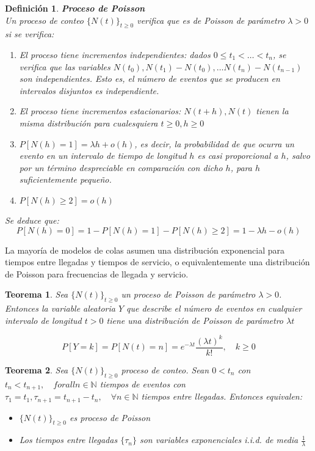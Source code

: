 \documentclass[a4paper,10pt]{scrartcl}
\newtheorem{mydefn}{Definición}
\newtheorem{theorem}{Teorema}
\numberwithin{equation}{section}
\begin{document}
  \begin{mydefn} \textbf{Proceso de Poisson}\\
  Un proceso de conteo $\{N(t)\}_{t\ge 0}$ verifica que es de Poisson de parámetro $\lambda > 0$ si se verifica:
  
  \begin{enumerate}
    \item El proceso tiene incrementos independientes: dados $0 \le t_1 < \ldots < t_n$, se verifica que
    las variables $N(t_0), N(t_1) - N(t_0), \ldots N(t_n)- N(t_{n-1})$ son independientes. Esto es, el número de eventos
    que se producen en intervalos disjuntos es independiente.
    \item El proceso tiene incrementos estacionarios: $N(t+h), N(t)$ tienen la misma distribución para cualesquiera
    $t\ge 0, h\ge 0$
    \item $P[N(h) = 1] = \lambda h + o(h)$, es decir, la probabilidad de que ocurra un evento en un intervalo de
    tiempo de longitud $h$ es casi proporcional a $h$, salvo por un término despreciable en comparación con dicho $h$, para
    $h$ suficientemente pequeño.
    \item $P[N(h) \ge 2] = o(h)$
  \end{enumerate}

  Se deduce que: 
  \[P[N(h) = 0] = 1 - P[N(h)=1] - P[N(h) \ge 2] = 1 -\lambda h - o(h)\]
  \end{mydefn}


La mayoría de modelos de colas asumen una distribución exponencial para tiempos entre llegadas y tiempos 
de servicio, o equivalentemente una distribución de Poisson para frecuencias de llegada y servicio.

\begin{theorem}
 Sea $\{N(t)\}_{t\ge 0}$ un proceso de Poisson de parámetro $\lambda > 0$. Entonces la variable aleatoria $Y$ que
 describe el número de eventos en cualquier intervalo de longitud $t > 0$ tiene una distribución de Poisson de parámetro
 $\lambda t$
 
 \[P[Y = k] = P[N(t) = n] = e^{-\lambda t} \frac{(\lambda t)^k}{k!}, \quad k\ge 0\]
 
\end{theorem}


\begin{theorem}
 Sea $\{N(t)\}_{t\ge 0}$ proceso de conteo. Sean $0 < t_n$ con $t_{n} < t_{n+1}, \quad forall n\in 
 \mathbb{N}$ tiempos de eventos con $\tau_1= t_1, \tau_{n+1} = t_{n+1} - t_{n}, \quad \forall n\in
 \mathbb{N}$ tiempos entre llegadas. Entonces equivalen:
 
 \begin{itemize}
  \item $\{N(t)\}_{t\ge 0}$ es proceso de Poisson
  \item Los tiempos entre llegadas $\{\tau_n\}$ son variables exponenciales i.i.d. de media $\frac{1}{\lambda}$
 \end{itemize}

\end{theorem}
\end{document}
